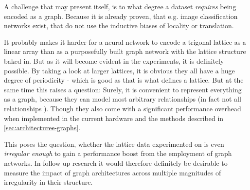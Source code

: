 A challenge that may present itself, is to what degree a dataset \emph{requires} being encoded as a graph.
Because it is already proven, that e.g. image classification networks exist, that do not use the inductive biases of locality or translation. 

It probably makes it harder for a neural network to encode a trigonal lattice as a linear array than as a purposefully built graph network with the lattice structure baked in.
But as it will become evident in the experiments, it is definitely possible. 
By taking a look at larger lattices, it is obvious they all have a huge degree of periodicity - which is good as that is what defines a lattice.
But at the same time this raises a question: Surely, it is convenient to represent everything as a graph, because they can model most arbitrary relationships (in fact not all relationships \cite{relationalInductiveBiasesAndGraphNetworks}). 
Though they also come with a significant performance overhead when implemented in the current hardware and the methods described in \autoref{sec:architectures-graphs}. 

This poses the question, whether the lattice data experimented on is even \emph{irregular enough} to gain a performance boost from the employment of graph networks.
In follow up research it would therefore definitely be desirable to measure the impact of graph architectures across multiple magnitudes of \glqq irregularity\grqq{} in their structure.
